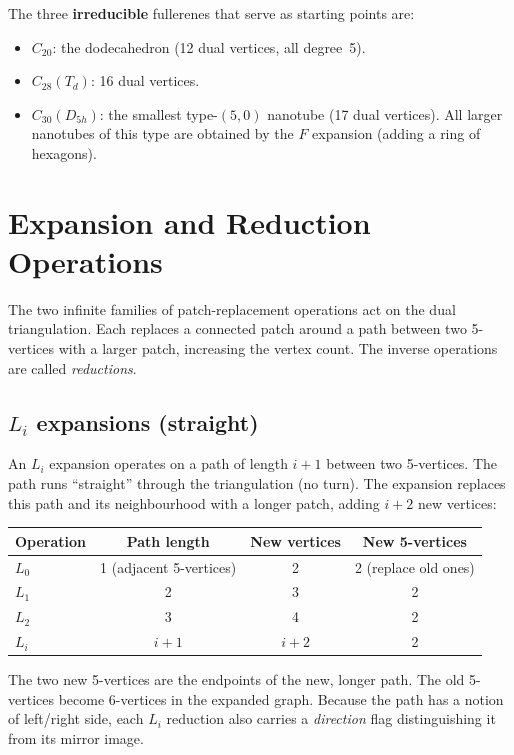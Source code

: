 \documentclass[11pt,a4paper]{article}
\theoremstyle{definition}
\begin{document}
The three \textbf{irreducible} fullerenes that serve as starting points are:
\begin{itemize}[nosep]
  \item $C_{20}$: the dodecahedron (12 dual vertices, all degree~5).
  \item $C_{28}(T_d)$: 16 dual vertices.
  \item $C_{30}(D_{5h})$: the smallest type-$(5,0)$ nanotube (17 dual
    vertices).  All larger nanotubes of this type are obtained by the
    $F$ expansion (adding a ring of hexagons).
\end{itemize}

\section{Expansion and Reduction Operations}\label{sec:operations}

The two infinite families of patch-replacement operations act on the
dual triangulation.  Each replaces a connected patch around a path
between two 5-vertices with a larger patch, increasing the vertex count.
The inverse operations are called \emph{reductions}.

\subsection{\texorpdfstring{$L_i$}{Li} expansions (straight)}

An $L_i$ expansion operates on a path of length $i+1$ between two
5-vertices.  The path runs ``straight'' through the triangulation
(no turn). The expansion replaces this path and its neighbourhood
with a longer patch, adding $i+2$ new vertices:
\begin{center}
\begin{tabular}{lccc}
Operation & Path length & New vertices & New 5-vertices \\
\hline
$L_0$ & 1 (adjacent 5-vertices) & 2 & 2 (replace old ones)\\
$L_1$ & 2 & 3 & 2 \\
$L_2$ & 3 & 4 & 2 \\
$L_i$ & $i+1$ & $i+2$ & 2 \\
\end{tabular}
\end{center}
The two new 5-vertices are the endpoints of the new, longer path.  The
old 5-vertices become 6-vertices in the expanded graph.  Because the
path has a notion of left/right side, each $L_i$ reduction also carries
a \emph{direction} flag distinguishing it from its mirror image.
\end{document}
